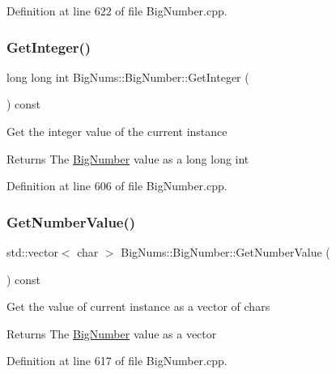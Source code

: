 Definition at line 622 of file Big\+Number.\+cpp.

\mbox{\label{class_big_nums_1_1_big_number_a4fb18fef2725c13a977ef6545563e361}} 
\subsubsection{\texorpdfstring{GetInteger()}{GetInteger()}}
{\footnotesize\ttfamily long long int Big\+Nums\+::\+Big\+Number\+::\+Get\+Integer (\begin{DoxyParamCaption}{ }\end{DoxyParamCaption}) const}

Get the integer value of the current instance \begin{DoxyReturn}{Returns}
The \mbox{\hyperlink{class_big_nums_1_1_big_number}{Big\+Number}} value as a long long int 
\end{DoxyReturn}


Definition at line 606 of file Big\+Number.\+cpp.

\mbox{\label{class_big_nums_1_1_big_number_af8f5505982e08fb73817cba94e70ff1c}} 
\subsubsection{\texorpdfstring{GetNumberValue()}{GetNumberValue()}}
{\footnotesize\ttfamily std\+::vector$<$ char $>$ Big\+Nums\+::\+Big\+Number\+::\+Get\+Number\+Value (\begin{DoxyParamCaption}{ }\end{DoxyParamCaption}) const}

Get the value of current instance as a vector of chars \begin{DoxyReturn}{Returns}
The \mbox{\hyperlink{class_big_nums_1_1_big_number}{Big\+Number}} value as a vector 
\end{DoxyReturn}


Definition at line 617 of file Big\+Number.\+cpp.

\mbox{\label{class_big_nums_1_1_big_number_a1f81565a354b88000e6fa6657bd138c6}} 
